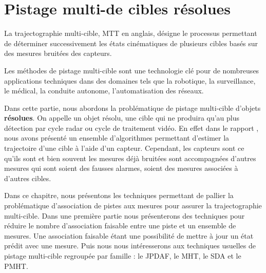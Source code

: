 \documentclass[10pt,french,a4paper]{report}
\begin{document}
									\section{Pistage multi-de cibles résolues}
						\label{chap:pistagemulti}
						La trajectographie multi-cible, \ac{MTT} en anglais, désigne le processus permettant de déterminer successivement les états cinématiques de plusieurs cibles basés sur des mesures bruitées des capteurs. 

Les méthodes de pistage multi-cible sont une technologie clé pour de nombreuses applications techniques dans des domaines tels que la robotique, la surveillance, le médical, la conduite autonome, l'automatisation des réseaux.
			
									Dans cette partie, nous abordons la problématique de pistage multi-cible d'objets \textbf{résolues}. On appelle un objet résolu, une cible qui ne produira qu'au plus détection par cycle radar ou cycle de traitement vidéo. En effet dans le rapport \cite{ONERA2020}, nous avons présenté un ensemble d'algorithmes permettant d'estimer la trajectoire d'une cible à l'aide d'un capteur. Cependant, les capteurs sont ce qu'ils sont et bien souvent les mesures déjà bruitées sont accompagnées d'autres mesures qui sont soient des fausses alarmes, soient des mesures associées à d'autres cibles.  
									
									Dans ce chapitre, nous présentons les techniques permettant de pallier la problématique d'association de pistes aux mesures pour assurer la trajectographie multi-cible. Dans une première partie nous présenterons des techniques pour réduire le nombre d'association faisable entre une piste et un ensemble de mesures. Une association faisable étant une possibilité de mettre à jour un état prédit avec une mesure. Puis nous nous intéresserons aux techniques usuelles de pistage multi-cible regroupée par famille : le \acf{JPDAF}, le \acf{MHT}, le \acf{SDA} et le \acf{PMHT}.
									
									
\end{document}
